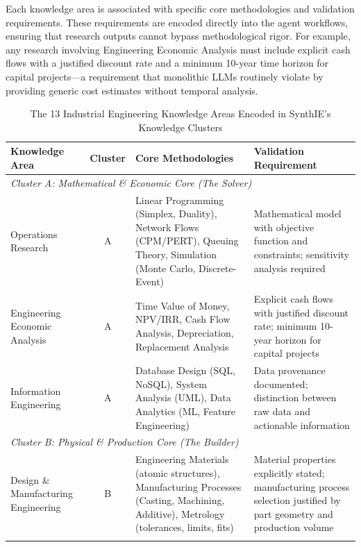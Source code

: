 \documentclass[12pt,a4paper]{article}
\begin{document}
Each knowledge area is associated with specific core methodologies and validation requirements. These requirements are encoded directly into the agent workflows, ensuring that research outputs cannot bypass methodological rigor. For example, any research involving Engineering Economic Analysis must include explicit cash flows with a justified discount rate and a minimum 10-year time horizon for capital projects—a requirement that monolithic LLMs routinely violate by providing generic cost estimates without temporal analysis.

\begin{table}[h]
\centering
\caption{The 13 Industrial Engineering Knowledge Areas Encoded in SynthIE's Knowledge Clusters}
\label{tab:knowledge_areas}
\small
\begin{tabular}{@{}p{3.5cm}cp{4cm}p{5cm}@{}}
\toprule
\textbf{Knowledge Area} & \textbf{Cluster} & \textbf{Core Methodologies} & \textbf{Validation Requirement} \\ \midrule

\multicolumn{4}{l}{\textit{Cluster A: Mathematical \& Economic Core (The Solver)}} \\
\midrule

Operations Research & A & Linear Programming (Simplex, Duality), Network Flows (CPM/PERT), Queuing Theory, Simulation (Monte Carlo, Discrete-Event) & Mathematical model with objective function and constraints; sensitivity analysis required \\
\addlinespace

Engineering Economic Analysis & A & Time Value of Money, NPV/IRR, Cash Flow Analysis, Depreciation, Replacement Analysis & Explicit cash flows with justified discount rate; minimum 10-year horizon for capital projects \\
\addlinespace

Information Engineering & A & Database Design (SQL, NoSQL), System Analysis (UML), Data Analytics (ML, Feature Engineering) & Data provenance documented; distinction between raw data and actionable information \\
\midrule

\multicolumn{4}{l}{\textit{Cluster B: Physical \& Production Core (The Builder)}} \\
\midrule

Design \& Manufacturing Engineering & B & Engineering Materials (atomic structures), Manufacturing Processes (Casting, Machining, Additive), Metrology (tolerances, limits, fits) & Material properties explicitly stated; manufacturing process selection justified by part geometry and production volume \\
\addlinespace


\end{tabular}
\end{table}
\end{document}
